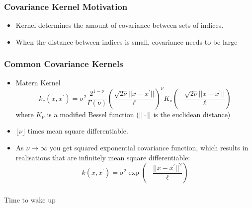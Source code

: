 \documentclass{beamer}
\begin{document}
\begin{frame}
    \frametitle{Covariance Kernel Motivation}\begin{itemize}
        \item Kernel determines the amount of covariance between sets of indices.
        \item When the distance between indices is small, covariance needs to be large
    \end{itemize}
\end{frame}

\begin{frame}
    \frametitle{Common Covariance Kernels}\begin{itemize}
        \item Matern Kernel
              $$k_\nu(x, x^\prime)
                  = \sigma^2\frac{2^{1 - \nu}}{\Gamma(\nu)}
                  \left(\frac{\sqrt{2\nu}||x - x^\prime||}{\ell}\right)^\nu
                  K_\nu\left(-\frac{\sqrt{2\nu}||x - x^\prime||}{\ell}\right)$$ where $K_\nu$ is a modified Bessel function ($||\cdot||$ is the euclidean distance)
        \item $\lfloor{\nu}\rfloor$ times mean square differentiable.
        \item As $\nu\to\infty$ you get squared exponential covariance function, which results in realisations that are infinitely mean square differentiable:
              $$k(x, x^\prime) = \sigma^2\exp(-\frac{||x - x^\prime||^2}{\ell})$$
    \end{itemize}
\end{frame}

\begin{frame}
    \frametitle{}
    Time to wake up
\end{frame}
\end{document}

